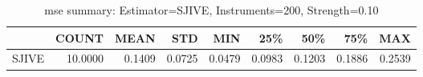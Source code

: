 \begin{table}[ht]
\centering
\caption{mse summary: Estimator=SJIVE, Instruments=200, Strength=0.10}
\begin{tabular}{lrrrrrrrr}
\toprule
 & COUNT & MEAN & STD & MIN & 25\% & 50\% & 75\% & MAX \\
\midrule
SJIVE & 10.0000 & 0.1409 & 0.0725 & 0.0479 & 0.0983 & 0.1203 & 0.1886 & 0.2539 \\
\bottomrule
\end{tabular}
\end{table}

